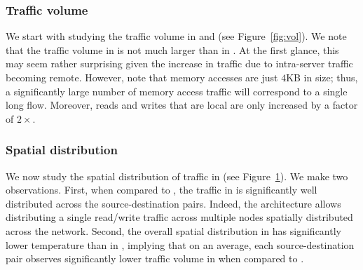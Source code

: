 \subsubsection{Traffic volume}
We start with studying the traffic volume in \dis and \pdis (see Figure~\ref{fig:vol}). We note that the traffic volume in \dis is not much larger than in \pdis. At the first glance, this may seem rather surprising given the increase in traffic due to intra-server traffic becoming remote. However, note that memory accesses are just $4$KB in size; thus, a significantly large number of memory access traffic will correspond to a single long flow. Moreover, reads and writes that are local are only increased by a factor of $2\times$.

%
\begin{figure}
  \centering
  \caption{\small{}}
  \label{fig:sd}
\end{figure}
%
\subsubsection{Spatial distribution}
We now study the spatial distribution of traffic in \dis (see Figure~\ref{fig:sd}). We make two observations. First, when compared to \pdis, the traffic in \dis is significantly well distributed across the source-destination pairs. Indeed, the \dis architecture allows distributing a single read/write traffic across multiple nodes spatially distributed across the network. Second, the overall spatial distribution in \dis has significantly lower temperature than in \pdis, implying that on an average, each source-destination pair observes significantly lower traffic volume in \dis when compared to \pdis.


